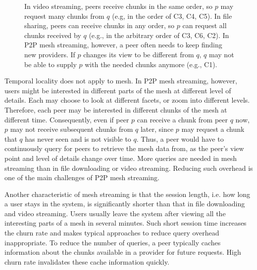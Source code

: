     \begin{figure}
    \centering
    \caption[Difference between P2P video streaming, P2P file sharing, and P2P view-dependent mesh streaming.]
    {In video streaming, peers receive chunks in the same order, so $p$
    may request many chunks from $q$ (e.g, in the order of C3, C4, C5).
	 In file sharing, peers can receive
    chunks in any order, so $p$ can request all chunks received by $q$
	(e.g., in the arbitrary order of C3, C6, C2). In
    P2P mesh streaming, however, a peer often needs to keep finding
    new providers.  If $p$ changes its view to be different from $q$,
	$q$ may not be able to supply $p$ with the needed chunks anymore 
	(e.g., C1). \label{f:diff}}
    \end{figure}

    Temporal locality does not apply to mesh.  In P2P mesh
    streaming, however, users might be interested in
    different parts of the mesh at different level of
    details.  Each may choose to look at different facets,
    or zoom into different levels.  Therefore, each peer may
    be interested in different chunks of the mesh at
    different time.  Consequently, even if peer $p$ can
    receive a chunk from peer $q$ now, $p$ may not receive
    subsequent chunks from $q$ later, since $p$ may request
    a chunk that $q$ has never seen and is not visible to
    $q$. %
    Thus, a peer would have
    to continuously query for peers to retrieve the mesh
    data from, as the peer's view point and level of details
    change over time.  More queries are needed in mesh
    streaming than in file downloading or video streaming.
    Reducing such overhead is one of the main challenges of
    P2P mesh streaming.

    Another characteristic of mesh streaming is that the
    session length, i.e. how long a user stays in the
    system, is significantly shorter than that in file
    downloading and video streaming.  Users usually leave
    the system after viewing all the interesting parts of a
    mesh in several minutes.  Such short session time
    increases the churn rate and makes typical approaches to
    reduce query overhead inappropriate. To reduce the
    number of queries, a peer typically caches information
    about the chunks available in a provider for future
    requests.  High churn rate invalidates these cache
    information quickly.

